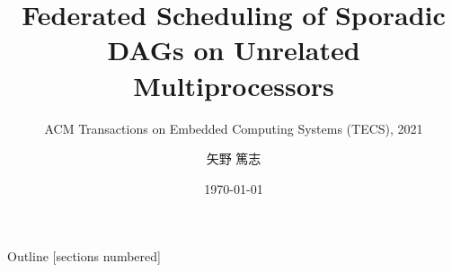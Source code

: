 \newcommand{\beamerDir}[0]{/mnt/c/Users/atsushi/Documents/workspace/env/Beamer/beamer/beamer/}





\newcommand{\forme}[1]{}


\title{Federated Scheduling of Sporadic DAGs on Unrelated Multiprocessors}
\subtitle{ACM Transactions on Embedded Computing Systems (TECS), 2021}
\author{矢野 篤志}
\date{\today}




\maketitle



\begin{frame}{Outline}
    [sections numbered]
    \small\tableofcontents[hideallsubsections]
\end{frame}











\lastpage

%     
%     


